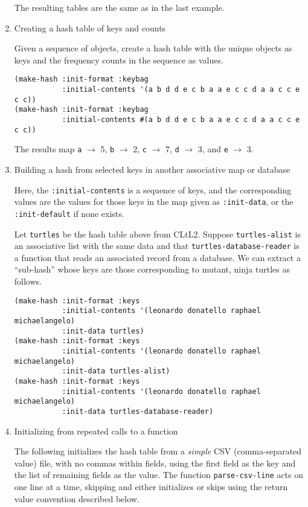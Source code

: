 \documentclass[11pt]{article}
\begin{document}
\begin{enumerate}
     The resulting tables are the same as in the last example.
\item Creating a hash table of keys and counts

     Given a sequence of objects, create a hash table with the unique
     objects as keys and the frequency counts in the sequence as values.


\begin{verbatim}
(make-hash :init-format :keybag
           :initial-contents '(a b d d e c b a a e c c d a a c c e c c))
(make-hash :init-format :keybag
           :initial-contents #(a b d d e c b a a e c c d a a c c e c c))
\end{verbatim}




     The results map \texttt{a} $\to$ 5, \texttt{b} $\to$ 2, \texttt{c} $\to$ 7, \texttt{d} $\to$ 3, and \texttt{e} $\to$ 3.
\item Building a hash from selected keys in another associative map or database

     Here, the \texttt{:initial-contents} is a sequence of keys, and the corresponding
     values are the values for those keys in the map given as \texttt{:init-data},
     or the \texttt{:init-default} if none exists.

     Let \texttt{turtles} be the hash table above from CLtL2. Suppose
     \texttt{turtles-alist} is an associative list with the same data and that
     \texttt{turtles-database-reader} is a function that reads an associated record
     from a database. We can extract a ``sub-hash'' whose keys are those
     corresponding to mutant, ninja turtles as follows.
     

\begin{verbatim}
(make-hash :init-format :keys
           :initial-contents '(leonardo donatello raphael michaelangelo)
           :init-data turtles)
(make-hash :init-format :keys
           :initial-contents '(leonardo donatello raphael michaelangelo)
           :init-data turtles-alist)
(make-hash :init-format :keys
           :initial-contents '(leonardo donatello raphael michaelangelo)
           :init-data turtles-database-reader)
\end{verbatim}
\item Initializing from repeated calls to a function

     The following initializes the hash table from a \emph{simple} CSV
     (comma-separated value) file, with no commas within fields, using the
     first field as the key and the list of remaining fields as the value.
     The function \texttt{parse-csv-line} acts on one line at a time, skipping and
     either initializes or skips using the return value convention described
     below.



\end{enumerate}
\end{document}
